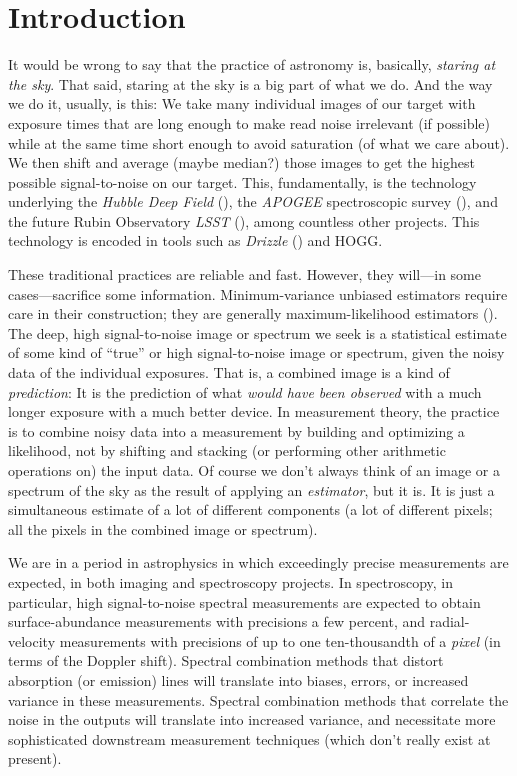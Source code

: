 \documentclass[modern]{aastex631}
\begin{document}
\section{Introduction}\label{sec:intro}

It would be wrong to say that the practice of astronomy is, basically, \emph{staring at the sky}.
That said, staring at the sky is a big part of what we do.
And the way we do it, usually, is this:
We take many individual images of our target with exposure times that are long enough to make read noise irrelevant (if possible) while at the same time short enough to avoid saturation (of what we care about).
We then shift and average (maybe median?) those images to get the highest possible signal-to-noise on our target.
This, fundamentally, is the technology underlying the \textsl{Hubble Deep Field} (\citealt{hdf}),
the \textsl{APOGEE} spectroscopic survey (\citealt{apogee}),
and the future Rubin Observatory \textsl{LSST} (\citealt{lsst}), among countless other projects.
This technology is encoded in tools such as \textsl{Drizzle} (\citealt{drizzle}) and HOGG.

These traditional practices are reliable and fast.
However, they will---in some cases---sacrifice some information.
Minimum-variance unbiased estimators require care in their construction; they are generally maximum-likelihood estimators (\citealt{mvue}). %
The deep, high signal-to-noise image or spectrum we seek is a statistical estimate of some kind of ``true'' or high signal-to-noise image or spectrum, given the noisy data of the individual exposures.
That is, a combined image is a kind of \emph{prediction}: It is the prediction of what \emph{would have been observed} with a much longer exposure with a much better device.
In measurement theory, the practice is to combine noisy data into a measurement by building and optimizing a likelihood, not by shifting and stacking (or performing other arithmetic operations on) the input data.
Of course we don't always think of an image or a spectrum of the sky as the result of applying an \emph{estimator}, but it is.
It is just a simultaneous estimate of a lot of different components (a lot of different pixels; all the pixels in the combined image or spectrum).

We are in a period in astrophysics in which exceedingly precise measurements are expected, in both imaging and spectroscopy projects.
In spectroscopy, in particular, high signal-to-noise spectral measurements are expected to obtain surface-abundance measurements with precisions a few percent, and radial-velocity measurements with precisions of up to one ten-thousandth of a \emph{pixel} (in terms of the Doppler shift).
Spectral combination methods that distort absorption (or emission) lines will translate into biases, errors, or increased variance in these measurements.
Spectral combination methods that correlate the noise in the outputs will translate into increased variance, and necessitate more sophisticated downstream measurement techniques (which don't really exist at present).
\end{document}
